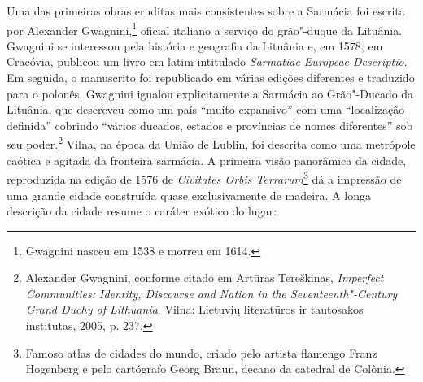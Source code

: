 Uma das primeiras obras eruditas mais consistentes sobre a Sarmácia foi
escrita por Alexander Gwagnini,\footnote{Gwagnini nasceu em 1538 e morreu em 1614.} oficial italiano a serviço
do grão"-duque da Lituânia. Gwagnini se interessou pela história e
geografia da Lituânia e, em 1578, em Cracóvia, publicou um livro em
latim intitulado \textit{Sarmatiae Europeae Descriptio}. Em seguida, o
manuscrito foi republicado em várias edições diferentes e traduzido para
o polonês. Gwagnini igualou explicitamente a Sarmácia ao Grão"-Ducado da
Lituânia, que descreveu como um país ``muito expansivo'' com uma
``localização definida'' cobrindo ``vários ducados, estados e províncias
de nomes diferentes'' sob seu poder.\footnote{Alexander Gwagnini, conforme citado em Artūras Tereškinas, \textit{Imperfect Communities: Identity, Discourse and Nation in the Seventeenth"-Century Grand Duchy of Lithuania}. Vilna: Lietuvių literatūros ir tautosakos institutas, 2005, p. 237.}
Vilna, na época da União de Lublin, foi descrita como uma metrópole
caótica e agitada da fronteira sarmácia. A primeira visão panorâmica da
cidade, reproduzida na edição de 1576 de \textit{Civitates Orbis Terrarum}\footnote{Famoso atlas de cidades do mundo, criado pelo artista flamengo Franz Hogenberg e pelo cartógrafo Georg Braun, decano da catedral de Colônia.} 
dá a impressão de uma grande cidade construída quase exclusivamente de
madeira. A longa descrição da cidade resume o caráter exótico do lugar:


